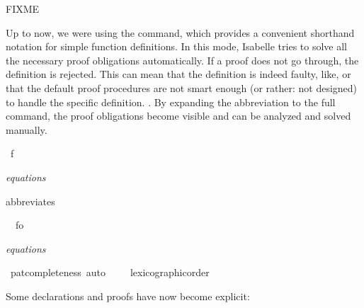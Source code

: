 \begin{isabellebody}
%
\endisadelimproof
%
\isamarkuptrue%
%
\begin{isamarkuptext}%
FIXME%
\end{isamarkuptext}%
\isamarkuptrue%
%
\isamarkuptrue%
%
\begin{isamarkuptext}%
Up to now, we were using the  command, which provides a
  convenient shorthand notation for simple function definitions. In
  this mode, Isabelle tries to solve all the necessary proof obligations
  automatically. If a proof does not go through, the definition is
  rejected. This can mean that the definition is indeed faulty, like,
  or that the default proof procedures are not smart enough (or
  rather: not designed) to handle the specific definition.
.
  By expanding the abbreviation to the full  command, the
  proof obligations become visible and can be analyzed and solved manually.%
\end{isamarkuptext}%
\isamarkuptrue%
\isamarkupfalse%
\ f\ {\isacharcolon}{\isacharcolon}\ {\isachardoublequoteopen}{\isasymtau}{\isachardoublequoteclose}\isanewline
{}\isanewline
\ \ %
\begin{isamarkuptext}%
\vspace{-0.8cm}\emph{equations}%
\end{isamarkuptext}%
\isamarkuptrue%
%
\begin{isamarkuptext}%
\noindent abbreviates%
\end{isamarkuptext}%
\isamarkuptrue%
\isamarkupfalse%
\ {\isacharparenleft}\ fo\ {\isacharcolon}{\isacharcolon}\ {\isachardoublequoteopen}{\isasymtau}{\isachardoublequoteclose}\isanewline
{}\isanewline
\ \ %
\isadelimproof
%
\endisadelimproof
%
\isatagproof
%
\begin{isamarkuptxt}%
\vspace{-0.8cm}\emph{equations}%
\end{isamarkuptxt}%
\isamarkuptrue%
\isamarkupfalse%
\ pat{\isacharunderscore}completeness\ auto%
\endisatagproof
{\isafoldproof}%
%
\isadelimproof
%
\endisadelimproof
\ \isanewline
{}\isamarkupfalse%
%
\isadelimproof
\ %
\endisadelimproof
%
\isatagproof
{}\isamarkupfalse%
\ lexicographic{\isacharunderscore}order%
\endisatagproof
{\isafoldproof}%
%
\isadelimproof
%
\endisadelimproof
%
\begin{isamarkuptext}%
Some declarations and proofs have now become explicit:


\end{isamarkuptext}
\end{isabellebody}

